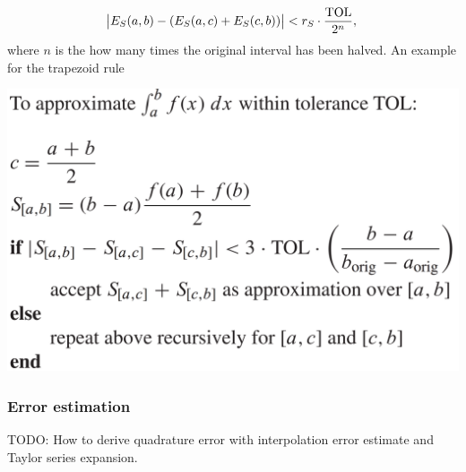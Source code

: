 $$
\abs{E_S(a,b) - (E_S(a,c) + E_S(c,b))} < r_S \cdot \frac{\text{TOL}}{2^n},
$$
where $n$ is the how many times the original interval has been halved. An example for the trapezoid rule
\begin{center}
\includegraphics[scale=0.18]{images/adaptive_quadrature.png}
\end{center}

\subsubsection{Error estimation}
TODO: How to derive quadrature error with interpolation error estimate and Taylor series expansion.